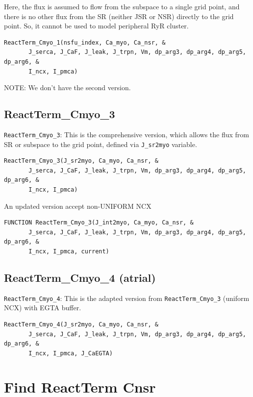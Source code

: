 Here, the flux is assumed to flow from the subspace to a single grid point, and
there is no other flux from the SR (neither JSR or NSR) directly to the grid
point. So, it cannot be used to model peripheral RyR cluster.
\begin{verbatim}
ReactTerm_Cmyo_1(nsfu_index, Ca_myo, Ca_nsr, &
       J_serca, J_CaF, J_leak, J_trpn, Vm, dp_arg3, dp_arg4, dp_arg5, dp_arg6, &
       I_ncx, I_pmca) 
\end{verbatim}

NOTE: We don't have the second version. 

\subsection{ReactTerm\_Cmyo\_3}

\verb!ReactTerm_Cmyo_3!: This is the comprehensive version, which allows the
flux from SR or subspace to the grid point, defined via \verb!J_sr2myo! variable.
\begin{verbatim}
ReactTerm_Cmyo_3(J_sr2myo, Ca_myo, Ca_nsr, &
       J_serca, J_CaF, J_leak, J_trpn, Vm, dp_arg3, dp_arg4, dp_arg5, dp_arg6, &
       I_ncx, I_pmca) 
\end{verbatim}

An updated version accept non-UNIFORM NCX 
\begin{verbatim}
FUNCTION ReactTerm_Cmyo_3(J_int2myo, Ca_myo, Ca_nsr, &  
       J_serca, J_CaF, J_leak, J_trpn, Vm, dp_arg3, dp_arg4, dp_arg5, dp_arg6, &     
       I_ncx, I_pmca, current)
\end{verbatim}

\subsection{ReactTerm\_Cmyo\_4 (atrial)}

\verb!ReactTerm_Cmyo_4!: This is the adapted version from
\verb!ReactTerm_Cmyo_3! (uniform NCX) with EGTA buffer.

\begin{verbatim}
ReactTerm_Cmyo_4(J_sr2myo, Ca_myo, Ca_nsr, &
       J_serca, J_CaF, J_leak, J_trpn, Vm, dp_arg3, dp_arg4, dp_arg5, dp_arg6, &
       I_ncx, I_pmca, J_CaEGTA) 
\end{verbatim}

\section{Find ReactTerm Cnsr}
\label{sec:cnsr_reactterm}

